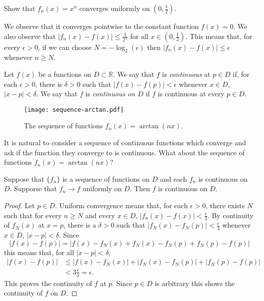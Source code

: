 \begin{example*}
  Show that \(f_n(x) = x^n\) converges uniformly on \((0,\frac{1}{2})\).
\end{example*}

\begin{solution}
  We observe that it converges pointwise to the constant function \(f(x)=0\).
  We also observe that \(|f_n(x) - f(x) | \leq \frac{1}{2^n}\) for all \(x\in (0,\frac{1}{2})\).
  This means that, for every \(\epsilon>0\), if we can choose \(N=-\log_{2}(\epsilon)\) then \(|f_n(x) - f(x) | \leq \epsilon\) whenever \(n\geq N\).
\end{solution}

\begin{definition}
  Let \(f(x)\) be a functions on \(D\subset \mathbb{R}\).
  We say that \(f\) is \emph{continuous} at \(p\in D\) if, for each \(\epsilon>0\), there is \(\delta >0\) such that \(|f(x)-f(p)| <\epsilon\) whenever \(x\in D\), \(|x-p| <\delta\).
  We say that \(f\) is \emph{continuous on \( D\)} if \(f\) is continuous at every \(p\in D\).
\end{definition}

\begin{figure}
  \begin{center}
    \texttt{[image: sequence-arctan.pdf]}
    \caption{The sequence of functions \(f_n(x)= \arctan(nx)\).}
  \end{center}
\end{figure}

It is natural to consider a sequence of continuous functions which converge and ask if the function they converge to is continuous.
What about the sequence of functions \(f_n(x) = \arctan (nx)\)?

\begin{theorem}%
  \label{thm:continuous-limit}
  Suppose that $\{f_n\}$ is a sequence of functions on $D$ and each $f_n$ is continuous on $D$.
  Supporse that \(f_n \to f\) uniformly on \(D\). Then \(f\) is continuous on \(D\).
\end{theorem}


\begin{proof}
  Let \(p\in D\).
  Uniform convergence means that, for each \(\epsilon>0\), there exists \(N\) such that for every \(n\geq N\) and every \(x\in D\), \(|f_n(x) - f(x)| < \frac{\epsilon}{3}\).
  By continuity of \(f_N(x)\) at \(x=p\), there is a \(\delta >0\) such that \(|f_N(x)-f_N(p)| < \frac{\epsilon}{3} \) whenever \(x\in D\), \(|x-p| <\delta\).
  Since
  \[
    | f(x) - f(p) | = |f(x) - f_N(x) + f_N(x) - f_N(p) + f_N(p) - f(p) | \]
  this means that, for all \(|x-p| <\delta\),
  \[
    \begin{aligned}
      | f(x) - f(p) | & \leq   |f(x) - f_N(x)| + |f_N(x) - f_N(p)| + |f_N(p) - f(p) | \\
                      & < 3 \frac{\epsilon}{3} = \epsilon.
    \end{aligned}
  \]
  This proves the continuity of \(f\) at \(p\). Since \(p\in D\) is arbitrary this shows the continuity of \(f\) on \(D\).
\end{proof}


